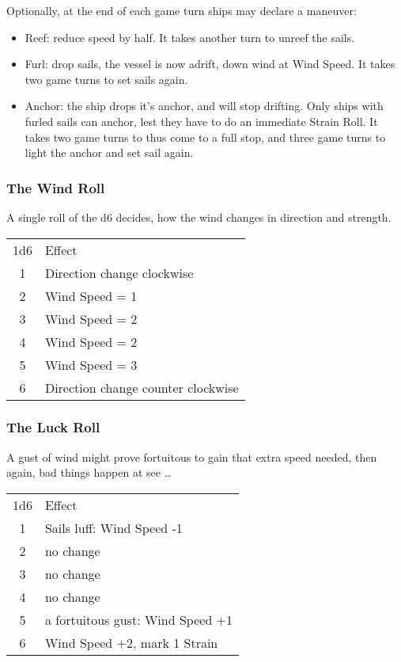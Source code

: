 \documentclass[11pt]{wbzine}
\begin{document}
\begin{multicols}{2}
Optionally, at the end of each game turn ships may declare a maneuver:

\begin{itemize}
\item
  Reef: reduce speed by half. It takes another turn to unreef the sails.
\item
  Furl: drop sails, the vessel is now adrift, down wind at Wind Speed.
  It takes two game turns to set sails again.
\item
  Anchor: the ship drops it's anchor, and will stop drifting. Only ships
  with furled sails can anchor, lest they have to do an immediate Strain
  Roll. It takes two game turns to thus come to a full stop, and three
  game turns to light the anchor and set sail again.
\end{itemize}

\subsubsection{The Wind Roll}

A single roll of the d6 decides, how the wind changes in direction and
strength.

\begin{tabularx}{\columnwidth}{cZ}
1d6 & Effect \\
1 & Direction change clockwise \\
2 & Wind Speed = 1 \\
3 & Wind Speed = 2 \\
4 & Wind Speed = 2 \\
5 & Wind Speed = 3 \\
6 & Direction change counter clockwise \\
\end{tabularx}

\subsubsection{The Luck Roll}

A gust of wind might prove fortuitous to gain that extra speed needed,
then again, bad things happen at see \ldots{}

\begin{tabularx}{\columnwidth}{cZ}
1d6 & Effect \\
1 & Sails luff: Wind Speed -1 \\
2 & no change \\
3 & no change \\
4 & no change \\
5 & a fortuitous gust: Wind Speed +1 \\
6 & Wind Speed +2, mark 1 Strain \\
\end{tabularx}


\end{multicols}
\end{document}
